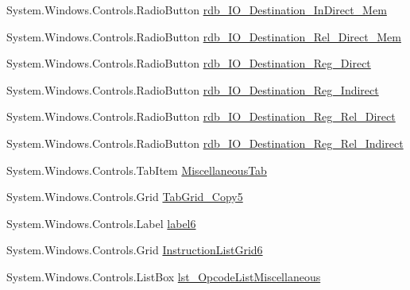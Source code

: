 \begin{DoxyCompactItemize}
\item 
System.\+Windows.\+Controls.\+Radio\+Button \hyperlink{class_c_p_u___o_s___simulator_1_1_instructions_window_a127c16315dc53cf8f16178b02101510a}{rdb\+\_\+\+I\+O\+\_\+\+Destination\+\_\+\+In\+Direct\+\_\+\+Mem}
\item 
System.\+Windows.\+Controls.\+Radio\+Button \hyperlink{class_c_p_u___o_s___simulator_1_1_instructions_window_a3c0a1993579e3ac64d3e4317a97bbd4e}{rdb\+\_\+\+I\+O\+\_\+\+Destination\+\_\+\+Rel\+\_\+\+Direct\+\_\+\+Mem}
\item 
System.\+Windows.\+Controls.\+Radio\+Button \hyperlink{class_c_p_u___o_s___simulator_1_1_instructions_window_a46bff5c8fa413e892c32053a5e6b1242}{rdb\+\_\+\+I\+O\+\_\+\+Destination\+\_\+\+Reg\+\_\+\+Direct}
\item 
System.\+Windows.\+Controls.\+Radio\+Button \hyperlink{class_c_p_u___o_s___simulator_1_1_instructions_window_a0c9a2fcb06946f8f0cda41a95ec66dd0}{rdb\+\_\+\+I\+O\+\_\+\+Destination\+\_\+\+Reg\+\_\+\+Indirect}
\item 
System.\+Windows.\+Controls.\+Radio\+Button \hyperlink{class_c_p_u___o_s___simulator_1_1_instructions_window_a815a4871db5ced3b59a3059f44def3b1}{rdb\+\_\+\+I\+O\+\_\+\+Destination\+\_\+\+Reg\+\_\+\+Rel\+\_\+\+Direct}
\item 
System.\+Windows.\+Controls.\+Radio\+Button \hyperlink{class_c_p_u___o_s___simulator_1_1_instructions_window_a5e5d4788bed79d4a6eb3311515c0296d}{rdb\+\_\+\+I\+O\+\_\+\+Destination\+\_\+\+Reg\+\_\+\+Rel\+\_\+\+Indirect}
\item 
System.\+Windows.\+Controls.\+Tab\+Item \hyperlink{class_c_p_u___o_s___simulator_1_1_instructions_window_ab7e1bbdc8bb2830d39fb9a4339aa27f2}{Miscellaneous\+Tab}
\item 
System.\+Windows.\+Controls.\+Grid \hyperlink{class_c_p_u___o_s___simulator_1_1_instructions_window_a495a21e0e96f26f87d3e379ab286256b}{Tab\+Grid\+\_\+\+Copy5}
\item 
System.\+Windows.\+Controls.\+Label \hyperlink{class_c_p_u___o_s___simulator_1_1_instructions_window_a23cbea70a5e1ab92348a9569f362db07}{label6}
\item 
System.\+Windows.\+Controls.\+Grid \hyperlink{class_c_p_u___o_s___simulator_1_1_instructions_window_a6c86a044f242ee64f312f0105bac6d36}{Instruction\+List\+Grid6}
\item 
System.\+Windows.\+Controls.\+List\+Box \hyperlink{class_c_p_u___o_s___simulator_1_1_instructions_window_a3ac59be147d3323d2b485551b3a3640a}{lst\+\_\+\+Opcode\+List\+Miscellaneous}
\item 

\end{DoxyCompactItemize}
